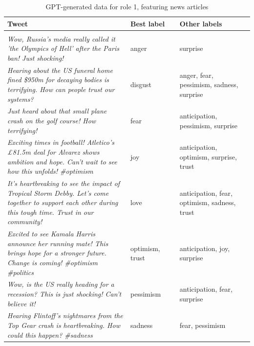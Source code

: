 \documentclass[manuscript]{clv3}
\begin{document}
\begin{table} [hbt!]
    \centering
    \begin{tabular}{|>{\centering\arraybackslash}p{0.5\linewidth}|>{\centering\arraybackslash}p{0.2\linewidth}|>{\centering\arraybackslash}p{0.3\linewidth}|} \hline 
           Tweet&  Best label& Other labels\\ \hline 
 \multicolumn{3}{|c|}{Role 1 + news articles multi-label GPT-generated examples}\\\hline
 \textit{Wow, Russia's media really called it 'the Olympics of Hell' after the Paris ban! Just shocking!}& anger&surprise\\\hline
 \textit{Hearing about the US funeral home fined \$950m for decaying bodies is terrifying. How can people trust our systems?}& disgust&anger, fear, pessimism, sadness, surprise\\\hline
 \textit{Just heard about that small plane crash on the golf course! How terrifying!}& fear&anticipation, pessimism, surprise\\\hline
 \textit{Exciting times in football! Atletico's £81.5m deal for Alvarez shows ambition and hope. Can't wait to see how this unfolds! \#optimism}& joy&anticipation, optimism, surprise, trust\\\hline
 \textit{It's heartbreaking to see the impact of Tropical Storm Debby. Let's come together to support each other during this tough time. Trust in our community!}& love&anticipation, fear, optimism, sadness, trust\\\hline
 \textit{Excited to see Kamala Harris announce her running mate! This brings hope for a stronger future. Change is coming! \#optimism \#politics}& optimism, trust&anticipation, joy, surprise\\\hline
 \textit{Wow, is the US really heading for a recession? This is just shocking! Can't believe it!}& pessimism&anticipation, fear, surprise\\\hline
 \textit{Hearing Flintoff's nightmares from the Top Gear crash is heartbreaking. How could this happen? \#sadness}& sadness&fear, pessimism\\\hline
    \end{tabular}
    \caption{GPT-generated data for role 1, featuring news articles}
    \label{tab:role_5_examples}
\end{table}
\end{document}
